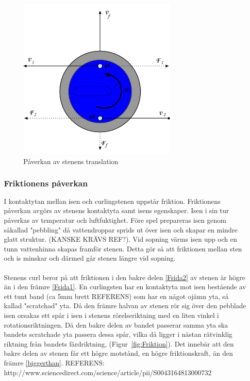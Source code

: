 \documentclass[11pt]{article} %
\begin{document}
\begin{figure}[ht!]
\centering
\includegraphics[width=80mm]{Translation.png}
\caption{Påverkan av stenens translation}
\label{fig:Translation}
\label{overflow}
\end{figure}

\subsubsection{Friktionens påverkan}
I kontaktytan mellan isen och curlingstenen uppstår friktion. Friktionens påverkan avgörs av stenens kontaktyta samt isens egenskaper. Isen i sin tur påverkas av temperatur och luftfuktighet. Före spel prepareras isen genom såkallad "pebbling" då vattendroppar sprids ut över isen och skapar en mindre glatt struktur. (KANSKE KRÄVS REF?). 
Vid sopning värms isen upp och en tunn vattenhinna skapas framför stenen. Detta gör så att friktionen mellan sten och is minskar och därmed går stenen längre vid sopning.  
\\\\Stenens curl beror på att friktionen i den bakre delen \eqref{Fsida2} av stenen är högre än i den främre \eqref{Fsida1}.  
En curlingsten har en kontaktyta mot isen bestående av ett tunt band (ca 5mm brett REFERENS) som har en något ojämn yta, så kallad "scratchad" yta. Då den främre halvan av stenen rör sig över den pebblade isen orsakas ett spår i isen i stenens rörelseriktning med en liten vinkel i rotationsriktningen. Då den bakre delen av bandet passerar samma yta ska bandets scratchade yta passera dessa spår, vilka då ligger i nästan rätvinklig riktning från bandets färdriktning, (Figur~\ref{fig:Friktion}). Det innebär att den bakre delen av stenen får ett högre motstånd, en högre friktionskraft, än den främre \eqref{biggerthan}. 
REFERENS: http://www.sciencedirect.com/science/article/pii/S0043164813000732
\end{document}
